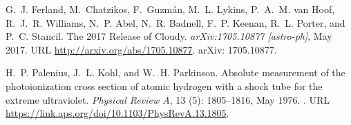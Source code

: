 \begin{thebibliography}{8}
G.~J. Ferland, M.~Chatzikos, F.~Guzmán, M.~L. Lykins, P.~A.~M. van Hoof,
  R.~J.~R. Williams, N.~P. Abel, N.~R. Badnell, F.~P. Keenan, R.~L. Porter, and
  P.~C. Stancil.
\newblock The 2017 {Release} of {Cloudy}.
\newblock \emph{arXiv:1705.10877 [astro-ph]}, May 2017.
\newblock URL \url{http://arxiv.org/abs/1705.10877}.
\newblock arXiv: 1705.10877.

H.~P. Palenius, J.~L. Kohl, and W.~H. Parkinson.
\newblock Absolute measurement of the photoionization cross section of atomic
  hydrogen with a shock tube for the extreme ultraviolet.
\newblock \emph{Physical Review A}, 13 (5): 1805--1816, May
  1976.
\newblock {}.
\newblock URL \url{https://link.aps.org/doi/10.1103/PhysRevA.13.1805}.

\end{thebibliography}
